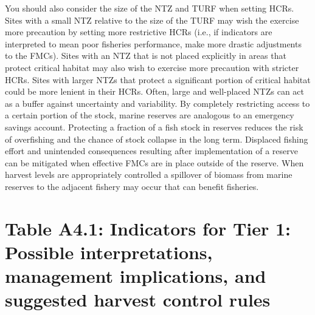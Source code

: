 \documentclass[]{book}
\begin{document}
You should also consider the size of the NTZ and TURF when setting HCRs.
Sites with a small NTZ relative to the size of the TURF may wish the
exercise more precaution by setting more restrictive HCRs (i.e., if
indicators are interpreted to mean poor fisheries performance, make more
drastic adjustments to the FMCs). Sites with an NTZ that is not placed
explicitly in areas that protect critical habitat may also wish to
exercise more precaution with stricter HCRs. Sites with larger NTZs that
protect a significant portion of critical habitat could be more lenient
in their HCRs. Often, large and well-placed NTZs can act as a buffer
against uncertainty and variability. By completely restricting access to
a certain portion of the stock, marine reserves are analogous to an
emergency savings account. Protecting a fraction of a fish stock in
reserves reduces the risk of overfishing and the chance of stock
collapse in the long term. Displaced fishing effort and unintended
consequences resulting after implementation of a reserve can be
mitigated when effective FMCs are in place outside of the reserve. When
harvest levels are appropriately controlled a spillover of biomass from
marine reserves to the adjacent fishery may occur that can benefit
fisheries.

\section{Table A4.1: Indicators for Tier 1: Possible interpretations,
management implications, and suggested harvest control
rules}\label{table-a4.1-indicators-for-tier-1-possible-interpretations-management-implications-and-suggested-harvest-control-rules}
\end{document}

